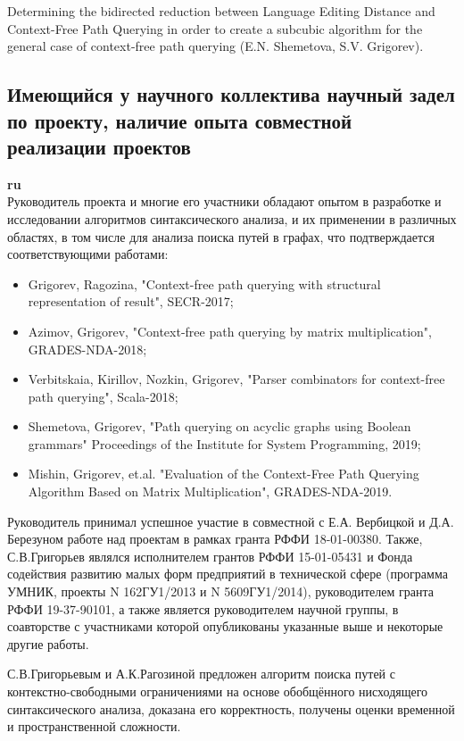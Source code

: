 \documentclass[12pt]{article}  %
\theoremstyle{remark}
\begin{document}
Determining the bidirected reduction between Language Editing Distance and Context-Free Path Querying in order to create a subcubic algorithm for the general case of context-free path querying (E.N. Shemetova, S.V. Grigorev).

\subsection{Имеющийся у научного коллектива научный задел по проекту, наличие опыта совместной реализации проектов}

\textbf{ru}\\
%
Руководитель проекта и многие его участники обладают опытом в разработке и исследовании алгоритмов синтаксического анализа, и их применении в различных областях, в том числе для анализа поиска путей в графах, что подтверждается соответствующими работами:
\begin{itemize}
  \item Grigorev, Ragozina, "Context-free path querying with structural representation of result", SECR-2017;
  \item Azimov, Grigorev, "Context-free path querying by matrix multiplication", GRADES-NDA-2018;
  \item Verbitskaia, Kirillov, Nozkin, Grigorev, "Parser combinators for context-free path querying", Scala-2018;
  \item Shemetova, Grigorev, "Path querying on acyclic graphs using Boolean grammars" Proceedings of the Institute for System Programming, 2019;
  \item Mishin, Grigorev, et.al. "Evaluation of the Context-Free Path Querying Algorithm Based on Matrix Multiplication", GRADES-NDA-2019.
\end{itemize}

Руководитель принимал успешное участие в совместной с Е.А. Вербицкой и Д.А. Березуном работе над проектам в рамках гранта РФФИ 18-01-00380.
Также, С.В.Григорьев являлся исполнителем грантов РФФИ 15-01-05431 и Фонда содействия развитию малых форм предприятий в технической сфере (программа УМНИК, проекты N 162ГУ1/2013 и N 5609ГУ1/2014), руководителем гранта РФФИ 19-37-90101, а также является руководителем научной группы, в соавторстве с участниками которой опубликованы указанные выше и некоторые другие работы.

С.В.Григорьевым и А.К.Рагозиной предложен алгоритм поиска путей с контекстно-свободными ограничениями на основе обобщённого нисходящего синтаксического анализа, доказана его корректность, получены оценки временной и пространственной сложности.
\end{document}
